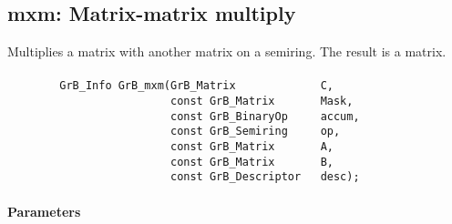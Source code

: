 \subsection{{\sf mxm}: Matrix-matrix multiply}

Multiplies a matrix with another matrix on a semiring. The result is a matrix.

\paragraph{\syntax}

\begin{verbatim}
        GrB_Info GrB_mxm(GrB_Matrix             C,
                         const GrB_Matrix       Mask,
                         const GrB_BinaryOp     accum,
                         const GrB_Semiring     op,
                         const GrB_Matrix       A,
                         const GrB_Matrix       B,
                         const GrB_Descriptor   desc);
\end{verbatim}

\paragraph{Parameters}

